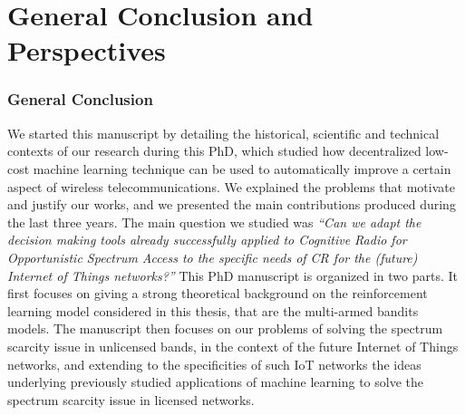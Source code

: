 
\chapter{General Conclusion and Perspectives}
\label{chapter:conclusion}

\graphicspath{{2-Chapters/6-Chapter/Images/}}



\subsection*{General Conclusion}


We started this manuscript by detailing the historical, scientific and technical contexts of our research during this PhD, which studied how decentralized low-cost machine learning technique can be used to automatically improve a certain aspect of wireless telecommunications.
%
We explained the problems that motivate and justify our works,
and we presented the main contributions produced during the last three years.
%
The main question we studied was \emph{``Can we adapt the decision making tools already successfully applied to Cognitive Radio for Opportunistic Spectrum Access to the specific needs of CR for the (future) Internet of Things networks?''}
%
This PhD manuscript is organized in two parts.
It first focuses on giving a strong theoretical background on the reinforcement learning model considered in this thesis, that are the multi-armed bandits models.
The manuscript then focuses on our problems of solving the spectrum scarcity issue in unlicensed bands, in the context of the future Internet of Things networks,
and extending to the specificities of such IoT networks the ideas underlying previously studied applications of machine learning to solve the spectrum scarcity issue in licensed networks.


